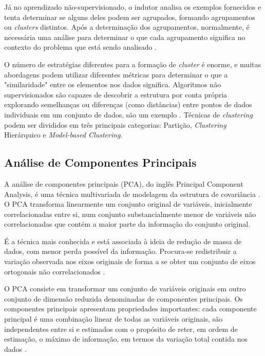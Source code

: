 Já no aprendizado não-supervisionado, o indutor analisa os exemplos fornecidos e tenta determinar se alguns deles podem ser agrupados, formando agrupamentos ou \textit{clusters} distintos. Após a determinação dos agrupamentos, normalmente, é necessária uma análise para determinar o que cada agrupamento significa no contexto do problema que está sendo analisado \cite{monard2003}.



O número de estratégias diferentes para a formação de \textit{cluster} é enorme, e muitas abordagens podem utilizar diferentes métricas para determinar o que a "similaridade" entre os elementos nos dados significa. Algoritmos não supervisionados são capazes de descobrir a estrutura por conta própria explorando semelhanças ou diferenças (como distâncias) entre pontos de dados individuais em um conjunto de dados, são um exemplo \cite{cios2007}. Técnicas de \textit{clustering} podem ser divididos em três principais categorias: Partição, \textit{Clustering} Hierárquico e \textit{Model-based Clustering}.




\subsection{Análise de Componentes Principais}

A análise de componentes principais (PCA), do inglês Principal Component Analysis, é uma técnica multivariada de modelagem da estrutura de covariância \cite{sandanielo2015}. 
O PCA transforma linearmente um conjunto
original de variáveis, inicialmente correlacionadas  entre si, num conjunto substancialmente menor de variáveis não correlacionadas que contém a maior parte da informação do conjunto original. 

É a técnica mais conhecida e
está associada à ideia de redução de massa de dados, com menor perda possível da
informação. Procura-se redistribuir a
variação observada nos eixos originais de
forma a se obter um conjunto de eixos
ortogonais não correlacionados  .


O PCA consiste em transformar
um conjunto de variáveis originais em outro
conjunto de dimensão reduzida denominadas de componentes principais.
Os componentes principais apresentam
propriedades importantes: cada
componente principal é uma combinação linear de todas as variáveis originais, são
independentes entre si e estimados com o
propósito de reter, em ordem de estimação,
o máximo de informação, em termos da
variação total contida nos dados
   .

